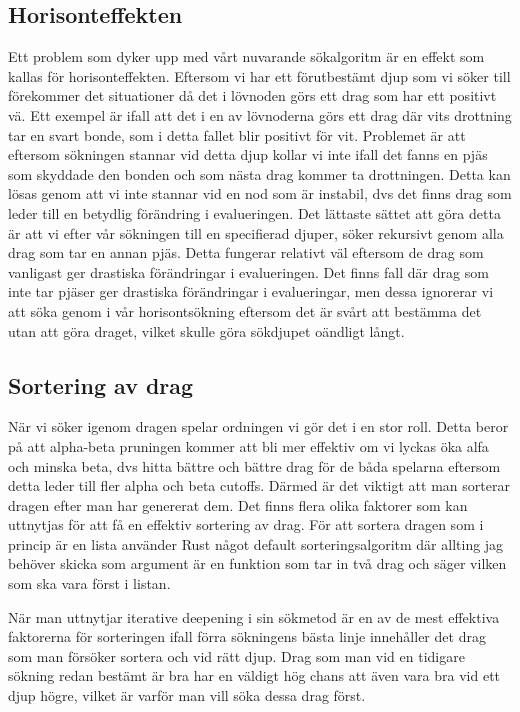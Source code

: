 \documentclass{article}
\begin{document}
\subsection{Horisonteffekten}

Ett problem som dyker upp med vårt nuvarande sökalgoritm är en effekt som kallas för horisonteffekten. Eftersom vi har ett förutbestämt djup som vi söker till förekommer det situationer då det i lövnoden görs ett drag som har ett positivt vä. Ett exempel är ifall att det i en av lövnoderna görs ett drag där vits drottning tar en svart bonde, som i detta fallet blir positivt för vit. Problemet är att eftersom sökningen stannar vid detta djup kollar vi inte ifall det fanns en pjäs som skyddade den bonden och som nästa drag kommer ta drottningen. Detta kan lösas genom att vi inte stannar vid en nod som är instabil, dvs det finns drag som leder till en betydlig förändring i evalueringen. Det lättaste sättet att göra detta är att vi efter vår sökningen till en specifierad djuper, söker rekursivt genom alla drag som tar en annan pjäs. Detta fungerar relativt väl eftersom de drag som vanligast ger drastiska förändringar i evalueringen. Det finns fall där drag som inte tar pjäser ger drastiska förändringar i evalueringar, men dessa ignorerar vi att söka genom i vår horisontsökning eftersom det är svårt att bestämma det utan att göra draget, vilket skulle göra sökdjupet oändligt långt.

\subsection{Sortering av drag}

När vi söker igenom dragen spelar ordningen vi gör det i en stor roll. Detta beror på att alpha-beta pruningen kommer att bli mer effektiv om vi lyckas öka alfa och minska beta, dvs hitta bättre och bättre drag för de båda spelarna eftersom detta leder till fler alpha och beta cutoffs. Därmed är det viktigt att man sorterar dragen efter man har genererat dem. Det finns flera olika faktorer som kan uttnytjas för att få en effektiv sortering av drag. För att sortera dragen som i princip är en lista använder Rust något default sorteringsalgoritm där allting jag behöver skicka som argument är en funktion som tar in två drag och säger vilken som ska vara först i listan.

När man uttnytjar iterative deepening i sin sökmetod är en av de mest effektiva faktorerna för sorteringen ifall förra sökningens bästa linje innehåller det drag som man försöker sortera och vid rätt djup. Drag som man vid en tidigare sökning redan bestämt är bra har en väldigt hög chans att även vara bra vid ett djup högre, vilket är varför man vill söka dessa drag först.
\end{document}
